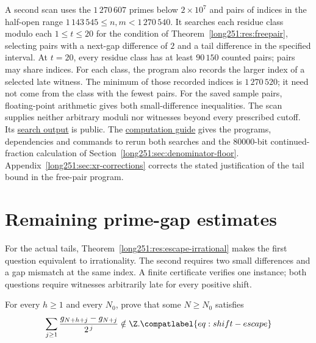 A second scan uses the $1\,270\,607$ primes below $2\times10^{7}$ and
pairs of indices in the half-open range
$1\,143\,545\le n,m<1\,270\,540$.  It searches each residue class modulo
each $1\le t\le20$ for the condition of
Theorem~\ref{long251:res:freepair}, selecting pairs with a next-gap difference of $2$ and a tail difference
in the specified interval.  At $t=20$, every residue
class has at least $90\,150$ counted pairs; pairs may share indices.
For each class, the program also records the larger index of a selected
late witness.  The minimum of those recorded indices is $1\,270\,520$;
it need not come from the class with the fewest pairs.  For the saved sample pairs, floating-point arithmetic gives both
small-difference inequalities.  The scan supplies neither arbitrary
moduli nor witnesses beyond every prescribed cutoff.  Its
\href{https://github.com/wcook04/plectis-erdos/blob/dd6cc708f650f061de06594eba6ba43878f4de31/research/experiments/erdos251/receipts/free-pair.json}{search output}
is public.
The \href{https://github.com/wcook04/plectis-erdos/blob/dd6cc708f650f061de06594eba6ba43878f4de31/research/experiments/erdos251/README.md}{computation guide}
gives the programs, dependencies and commands to rerun both searches and
the $80000$-bit continued-fraction calculation of
Section~\ref{long251:sec:denominator-floor}.
Appendix~\ref{long251:sec:xr-corrections} corrects the stated
justification of the tail bound in the free-pair program.

\section{Remaining prime-gap estimates}\label{long251:sec:open}

For the actual tails, Theorem~\ref{long251:res:escape-irrational} makes
the first question equivalent to irrationality.  The second requires
two small differences and a gap mismatch at the same index.  A finite
certificate verifies one instance; both questions require witnesses
arbitrarily late for every positive shift.

\begin{problem}\label{long251:prob:escape}
For every $h\ge1$ and every $N_0$, prove that some $N\ge N_0$ satisfies
\begin{equation}
 \sum_{j\ge1}\frac{g_{N+h+j}-g_{N+j}}{2^{\,j}}\notin\Z .
\label{long251:eq:shift-escape}\compatlabel{eq:shift-escape}
\end{equation}
\end{problem}


